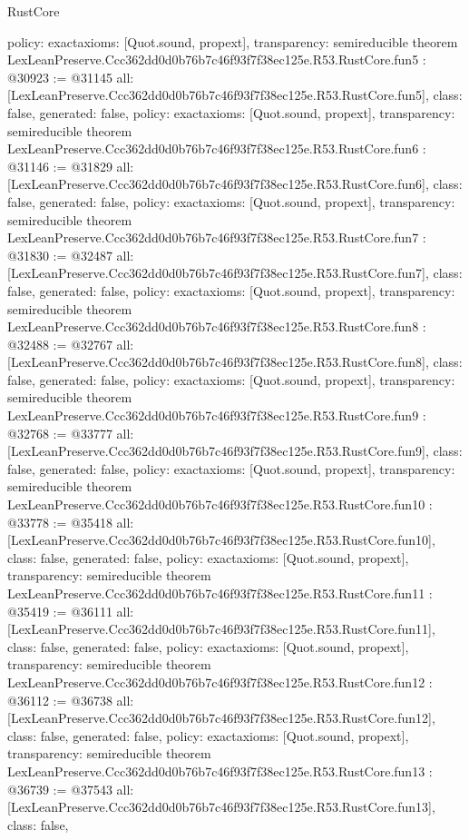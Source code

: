 \begin{lexlean}{RustCore}
\begin{coremodule}
{  policy: exact{axioms: [Quot.sound, propext]},
  transparency: semireducible
}
theorem LexLeanPreserve.Ccc362dd0d0b76b7c46f93f7f38ec125e.R53.RustCore.fun5 : @30923 := @31145 {
  all: [LexLeanPreserve.Ccc362dd0d0b76b7c46f93f7f38ec125e.R53.RustCore.fun5],
  class: false,
  generated: false,
  policy: exact{axioms: [Quot.sound, propext]},
  transparency: semireducible
}
theorem LexLeanPreserve.Ccc362dd0d0b76b7c46f93f7f38ec125e.R53.RustCore.fun6 : @31146 := @31829 {
  all: [LexLeanPreserve.Ccc362dd0d0b76b7c46f93f7f38ec125e.R53.RustCore.fun6],
  class: false,
  generated: false,
  policy: exact{axioms: [Quot.sound, propext]},
  transparency: semireducible
}
theorem LexLeanPreserve.Ccc362dd0d0b76b7c46f93f7f38ec125e.R53.RustCore.fun7 : @31830 := @32487 {
  all: [LexLeanPreserve.Ccc362dd0d0b76b7c46f93f7f38ec125e.R53.RustCore.fun7],
  class: false,
  generated: false,
  policy: exact{axioms: [Quot.sound, propext]},
  transparency: semireducible
}
theorem LexLeanPreserve.Ccc362dd0d0b76b7c46f93f7f38ec125e.R53.RustCore.fun8 : @32488 := @32767 {
  all: [LexLeanPreserve.Ccc362dd0d0b76b7c46f93f7f38ec125e.R53.RustCore.fun8],
  class: false,
  generated: false,
  policy: exact{axioms: [Quot.sound, propext]},
  transparency: semireducible
}
theorem LexLeanPreserve.Ccc362dd0d0b76b7c46f93f7f38ec125e.R53.RustCore.fun9 : @32768 := @33777 {
  all: [LexLeanPreserve.Ccc362dd0d0b76b7c46f93f7f38ec125e.R53.RustCore.fun9],
  class: false,
  generated: false,
  policy: exact{axioms: [Quot.sound, propext]},
  transparency: semireducible
}
theorem LexLeanPreserve.Ccc362dd0d0b76b7c46f93f7f38ec125e.R53.RustCore.fun10 : @33778 := @35418 {
  all: [LexLeanPreserve.Ccc362dd0d0b76b7c46f93f7f38ec125e.R53.RustCore.fun10],
  class: false,
  generated: false,
  policy: exact{axioms: [Quot.sound, propext]},
  transparency: semireducible
}
theorem LexLeanPreserve.Ccc362dd0d0b76b7c46f93f7f38ec125e.R53.RustCore.fun11 : @35419 := @36111 {
  all: [LexLeanPreserve.Ccc362dd0d0b76b7c46f93f7f38ec125e.R53.RustCore.fun11],
  class: false,
  generated: false,
  policy: exact{axioms: [Quot.sound, propext]},
  transparency: semireducible
}
theorem LexLeanPreserve.Ccc362dd0d0b76b7c46f93f7f38ec125e.R53.RustCore.fun12 : @36112 := @36738 {
  all: [LexLeanPreserve.Ccc362dd0d0b76b7c46f93f7f38ec125e.R53.RustCore.fun12],
  class: false,
  generated: false,
  policy: exact{axioms: [Quot.sound, propext]},
  transparency: semireducible
}
theorem LexLeanPreserve.Ccc362dd0d0b76b7c46f93f7f38ec125e.R53.RustCore.fun13 : @36739 := @37543 {
  all: [LexLeanPreserve.Ccc362dd0d0b76b7c46f93f7f38ec125e.R53.RustCore.fun13],
  class: false,
}
\end{coremodule}
\end{lexlean}
